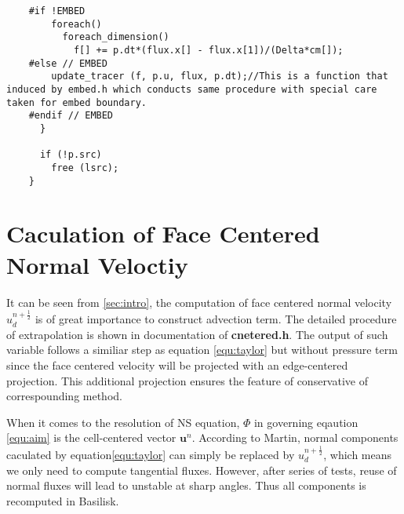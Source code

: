 \documentclass[a4paper]{article}
\newcommand{\para}[1]{\textbf{\emph{\textcolor{para}{#1}}}}
\begin{document}
\begin{center}
\end{center}


\begin{multicols}{2}
  \columnbreak
  \begin{verbatim}
    #if !EMBED
        foreach()
          foreach_dimension()
            f[] += p.dt*(flux.x[] - flux.x[1])/(Delta*cm[]);
    #else // EMBED
        update_tracer (f, p.u, flux, p.dt);//This is a function that induced by embed.h which conducts same procedure with special care taken for embed boundary.
    #endif // EMBED
      }

      if (!p.src)
        free (lsrc);
    }
  \end{verbatim}
\end{multicols}

\appendix
\section{Caculation of Face Centered Normal Veloctiy}
It can be seen from \ref{sec:intro}, the computation of face centered normal velocity $u_d^{n+ \frac{1}{2}}$ is of great importance to construct advection term. The detailed procedure of extrapolation is shown in documentation of \textbf{cnetered.h}. The output of such variable follows a similiar step as equation \ref{equ:taylor} but without pressure term since the face centered velocity will be projected with an edge-centered projection. This additional projection ensures the feature of conservative of correspounding method.\par
When it comes to the resolution of NS equation, $\Phi$ in governing eqaution \ref{equ:aim} is the cell-centered vector $ \mathbf{u}^n$. According to Martin\cite{martin2000cell}, normal components caculated by equation\ref{equ:taylor} can simply be replaced by $u_d^{n+ \frac{1}{2}}$, which means we only need to compute tangential fluxes. However, after series of tests, reuse of normal fluxes will lead to unstable at sharp angles. Thus all components is recomputed in Basilisk\cite{popinet2003gerris}.
\printbibliography
\end{document}
